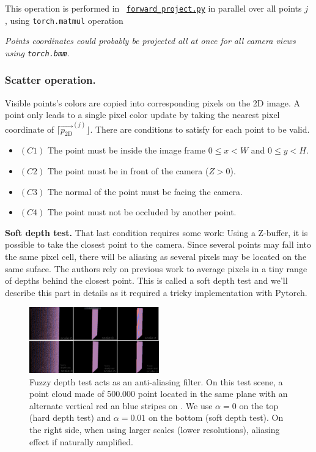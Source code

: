 This operation is performed in ~\href{https://github.com/balthazarneveu/per-pixel-point-rendering/blob/main/src/pixr/rendering/forward_project.py}{\texttt{forward\_project.py}} in parallel over all points $j$ , using \texttt{torch.matmul} operation

\noindent \textit{Points coordinates could probably be projected all at once for all camera views using \texttt{torch.bmm}.}

\subsubsection{Scatter operation.}
\label{sec:scatter_op}

Visible points's colors are copied into corresponding pixels on the 2D image. A point only leads to a single pixel color update by taking the nearest pixel coordinate of $\lceil\vec{p_{\textrm{2D}}}^{(j)}\rfloor$. There are conditions to satisfy for each point to be valid. 
\begin{itemize}
    \item $(C1)$ The point must be inside the image frame $0\leq x<W$ and $0\leq y <H$.
    \item $(C2)$ The point must be in front of the camera ($Z>0$).
    \item $(C3)$ The normal of the point must be facing the camera.
    \item $(C4)$ The point must not be occluded by another point.
\end{itemize}

\noindent \textbf{Soft depth test.} 
That last condition requires some work:
Using a Z-buffer, it is possible to take the closest point to the camera. Since several points may fall into the same pixel cell, there will be aliasing as several pixels may be located on the same suface. The authors rely on previous work \cite{schutz2021rendering} to average pixels in a tiny range of depths behind the closest point. This is called a soft depth test and we'll describe this part in details as it required a tricky implementation with Pytorch.

\begin{figure}[H]
    \centering
    \includegraphics[width=0.5\textwidth]{figures/fuzzy_depth_test_aliasing_large.png}
    \caption{Fuzzy depth test acts as an anti-aliasing filter. On this test scene, a point cloud made of 500.000 point located in the same plane with an alternate vertical red an blue stripes on . We use $\alpha=0$ on the top (hard depth test) and $\alpha=0.01$ on the bottom (soft depth test). On the right side, when using larger scales (lower resolutions), aliasing effect if naturally amplified.}
    \label{fig:fuzzy_depth_test_AA}
\end{figure}

